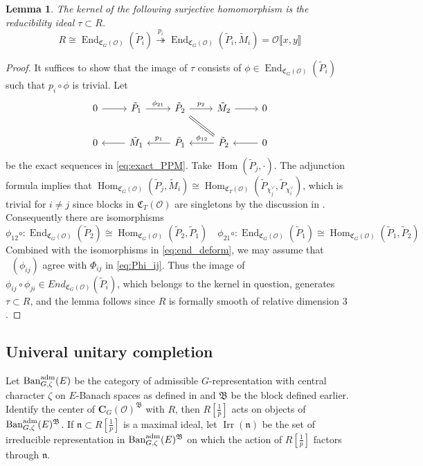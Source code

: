 \documentclass[leqno]{amsart}
\newcommand{\Ban}{\textnormal{Ban}^{\textnormal{adm}}}
\newcommand{\B}{\mathfrak B}
\newcommand{\fC}{\mathfrak{C}}
\DeclareMathOperator{\V}{\check{\mathbf{V}}} %
\DeclareMathOperator{\Irr}{Irr}
\newcommand{\C}{\mathbf C}
\newcommand{\oo}{\mathcal{O}} %
\newcommand{\fn}{\mathfrak{n}}
\DeclareMathOperator{\End}{End}
\DeclareMathOperator{\Hom}{Hom}
\newtheorem{lem}[thm]{Lemma}
\theoremstyle{definition}
\theoremstyle{remark}
\begin{document}
\begin{lem}\label{lem:ker_red}
	The kernel of the following 
	surjective homomorphism 
	is the reducibility ideal $\tau\subset R$.
	\begin{equation}
	R\cong 
	\End_{\fC_G(\oo)}(\tilde{P}_i)
	\overset{p_i}{\twoheadrightarrow}
	\End_{\fC_G(\oo)}(\tilde{P}_i, \tilde{M}_i)=
	\oo\llbracket x,y\rrbracket
	\end{equation}
\end{lem}
\begin{proof}
It suffices to show that 
the image of $\tau$ consists of 
$\phi\in \End_{\fC_G(\oo)}(\tilde{P}_i)$
such that $p_i\circ \phi$ is trivial.
Let
\[
\begin{tikzcd}
	0 \arrow[r]&
	\tilde{P}_1  \arrow[r,"\phi_{21}"]  &
	\tilde{P}_2 \arrow[r,"p_2"] \arrow[dr,equal] &
	\tilde{M}_2  \arrow[r] & 0 \\
	0 & 
	\tilde{M}_1 \arrow[l]&
	\tilde{P}_1 \arrow[l,"p_1",swap]  &
	\tilde{P}_2  \arrow[l,"\phi_{12}",swap]  & 
	0  \arrow[l] 
\end{tikzcd}
\]
be the exact sequences in \eqref{eq:exact_PPM}.
Take $\Hom(\tilde{P}_j,\cdot)$.
The adjunction formula implies that
$\Hom_{\fC_G(\oo)}(\tilde{P}_j,\tilde{M}_i)\cong
\Hom_{\fC_T(\oo)}
(\tilde{P}_{\chi_j^\vee},\tilde{P}_{\chi_i^\vee})$,
which is trivial for $i\neq j$
since blocks in $\fC_T(\oo)$ are singletons
by the discussion in \cite[\S 7.2]{pask}.
Consequently there are isomorphisms
\[
	\phi_{12}\circ\colon
	\End_{\fC_G(\oo)}(\tilde{P}_2)\cong
	\Hom_{\fC_G(\oo)}(\tilde{P}_2, \tilde{P}_1)\quad
	\phi_{21}\circ\colon
	\End_{\fC_G(\oo)}(\tilde{P}_1)\cong
	\Hom_{\fC_G(\oo)}(\tilde{P}_1, \tilde{P}_2)
\]
Combined with the isomorphisms in \eqref{eq:end_deform},
we may assume that $\V(\phi_{ij})$ agree with 
$\Phi_{ij}$ in \eqref{eq:Phi_ij}.
Thus the image of 
$\phi_{ij}\circ\phi_{ji}\in End_{\fC_G(\oo)}(\tilde{P}_i)$,
which belongs to the kernel in question,
generates $\tau\subset R$,
and the lemma follows 
since  $R$ is formally smooth of relative dimension  $3$.
\end{proof}

\subsection{Univeral unitary completion}

Let $\Ban_{G,\zeta}(E)$
be the category of admissible 
$G$-representation with central character $\zeta$
on $E$-Banach spaces
as defined in \cite{pask}
and  $\B$ be the block defined earlier.
Identify the center of $\C_G(\oo)^\B$ with  $R$,
then  $R[\frac{1}{p}]$ acts on objects of $\Ban_{G,\zeta}(E)^{\B}$.
If $\fn\subset R[\frac{1}{p}]$ is a maximal ideal,
let $\Irr(\fn)$ be the set of
irreducible representation in  $\Ban_{G,\zeta}(E)^{\B}$
on which the action of $R[\frac{1}{p}]$ 
factors through $\fn$.
\end{document}
